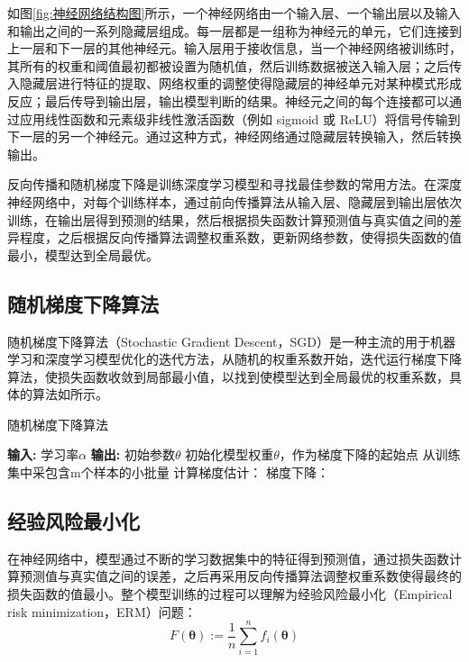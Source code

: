 如图\ref{fig:神经网络结构图}所示，一个神经网络由一个输入层、一个输出层以及输入和输出之间的一系列隐藏层组成。每一层都是一组称为神经元的单元，它们连接到上一层和下一层的其他神经元。输入层用于接收信息，当一个神经网络被训练时，其所有的权重和阈值最初都被设置为随机值，然后训练数据被送入输入层；之后传入隐藏层进行特征的提取、网络权重的调整使得隐藏层的神经单元对某种模式形成反应；最后传导到输出层，输出模型判断的结果。神经元之间的每个连接都可以通过应用线性函数和元素级非线性激活函数（例如 sigmoid 或 ReLU）将信号传输到下一层的另一个神经元。通过这种方式，神经网络通过隐藏层转换输入，然后转换输出。

反向传播和随机梯度下降是训练深度学习模型和寻找最佳参数的常用方法。在深度神经网络中，对每个训练样本，通过前向传播算法从输入层、隐藏层到输出层依次训练，在输出层得到预测的结果，然后根据损失函数计算预测值与真实值之间的差异程度，之后根据反向传播算法调整权重系数，更新网络参数，使得损失函数的值最小，模型达到全局最优。

\subsection{随机梯度下降算法}
随机梯度下降算法（Stochastic Gradient Descent，SGD）是一种主流的用于机器学习和深度学习模型优化的迭代方法，从随机的权重系数开始，迭代运行梯度下降算法，使损失函数收敛到局部最小值，以找到使模型达到全局最优的权重系数，具体的算法如所示。

\begin{algorithm}[!htb]
	\caption{随机梯度下降算法}
	\label{随机梯度下降算法}
	\begin{algorithmic}[1]
		\footnotesize
		\STATE \textbf{输入:} 学习率$\alpha$
		\STATE \textbf{输出:} 初始参数$\theta$
		\STATE 初始化模型权重$\theta$，作为梯度下降的起始点
		\STATE 从训练集中采包含m个样本的小批量
		\STATE 计算梯度估计：
		\STATE 梯度下降：
		\ENDWHILE
	\end{algorithmic}
\end{algorithm}

\subsection{经验风险最小化}
在神经网络中，模型通过不断的学习数据集中的特征得到预测值，通过损失函数计算预测值与真实值之间的误差，之后再采用反向传播算法调整权重系数使得最终的损失函数的值最小。整个模型训练的过程可以理解为经验风险最小化（Empirical risk minimization，ERM）问题：
\begin{equation}\label{eq:ERM}
F(\boldsymbol{\theta}):=\frac{1}{n} \sum_{i=1}^{n} f_{i}(\boldsymbol{\theta})
\end{equation}

